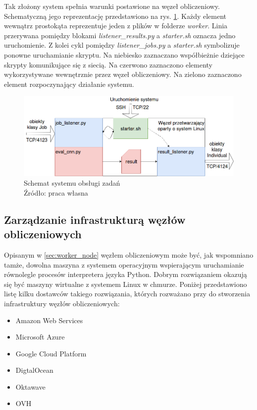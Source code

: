Tak złożony system spełnia warunki postawione na węzeł obliczeniowy.
Schematyczną jego reprezentację przedstawiono na rys. \ref{fig:worker_node}.
Każdy element wewnątrz prostokąta reprezentuje jeden z plików w folderze \textit{worker}.
Linia przerywana pomiędzy blokami \textit{listener\_results.py} a \textit{starter.sh} oznacza jedno uruchomienie.
Z kolei cykl pomiędzy \textit{listener\_jobs.py} a \textit{starter.sh} symbolizuje ponowne uruchamianie skryptu.
Na niebiesko zaznaczano współbieżnie dziejące skrypty komunikujące się z siecią.
Na czerwono zaznaczono elementy wykorzystywane wewnętrznie przez węzeł obliczeniowy.
Na zielono zaznaczono element rozpoczynający działanie systemu.
\begin{figure}[h!tb]
	 \centering
	 \includegraphics[width = 1.0\linewidth]{img/worker_node}
	 \caption{Schemat systemu obsługi zadań \\
              Źródło: praca własna}
	 \label{fig:worker_node}
\end{figure}

\subsection{Zarządzanie infrastrukturą węzłów obliczeniowych}\label{sec:azure}
Opisanym w \ref{sec:worker_node} węzłem obliczeniowym może być, jak wspomniano tamże, dowolna maszyna z systemem operacyjnym wspierającym uruchamianie równolegle procesów interpretera języka Python.
Dobrym rozwiązaniem okazują się być maszyny wirtualne z systemem Linux w chmurze.
Poniżej przedstawiono listę kilku dostawców takiego rozwiązania, których rozważano przy do stworzenia infrastruktury węzłów obliczeniowych:

\begin{itemize}
  \item Amazon Web Services
  \item Microsoft Azure
  \item Google Cloud Platform
  \item DigtalOcean
  \item Oktawave
  \item OVH
\end{itemize}

